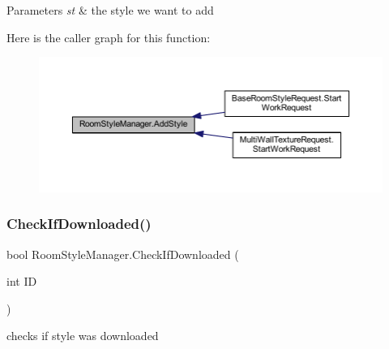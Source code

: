 \begin{DoxyParams}{Parameters}
{\em st} & the style we want to add\\
\hline
\end{DoxyParams}
Here is the caller graph for this function\+:
\nopagebreak
\begin{figure}[H]
\begin{center}
\leavevmode
\includegraphics[width=350pt]{class_room_style_manager_a2b0802f24ffe1c2cb4db101359c6bf5e_icgraph}
\end{center}
\end{figure}
\mbox{\label{class_room_style_manager_a4cc11d2cbbe1a94def12775722d64b74}} 
\subsubsection{\texorpdfstring{Check\+If\+Downloaded()}{CheckIfDownloaded()}}
{\footnotesize\ttfamily bool Room\+Style\+Manager.\+Check\+If\+Downloaded (\begin{DoxyParamCaption}\item[{int}]{ID }\end{DoxyParamCaption})}



checks if style was downloaded 


